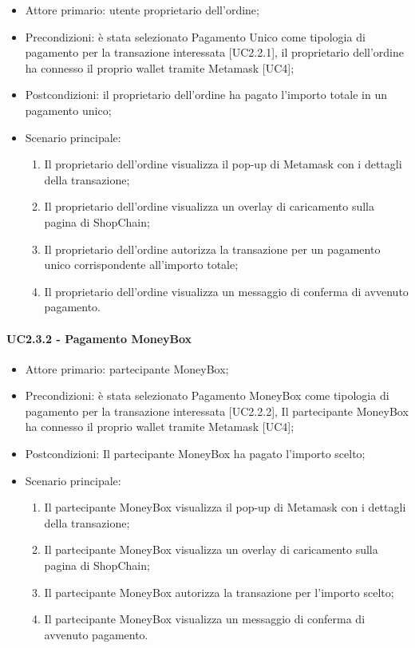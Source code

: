 \begin{itemize}
    \item Attore primario: utente proprietario dell'ordine;
    \item Precondizioni: è stata selezionato Pagamento Unico come tipologia di pagamento per la transazione interessata [UC2.2.1], 
            il proprietario dell'ordine ha connesso il proprio wallet\glo{} tramite Metamask\glo{} [UC4];
    \item Postcondizioni: il proprietario dell'ordine ha pagato l'importo totale in un pagamento unico;
    \item Scenario principale:
    \begin{enumerate}
        \item Il proprietario dell'ordine visualizza il pop-up di Metamask\glo{} con i dettagli della transazione;
        \item Il proprietario dell'ordine visualizza un overlay di caricamento sulla pagina di ShopChain;
        \item Il proprietario dell'ordine autorizza la transazione per un pagamento unico corrispondente all'importo totale;
        \item Il proprietario dell'ordine visualizza un messaggio di conferma di avvenuto pagamento.
    \end{enumerate}
\end{itemize}

\paragraph{UC2.3.2 - Pagamento MoneyBox}

\begin{itemize}
    \item Attore primario: partecipante MoneyBox\glo{};
    \item Precondizioni: è stata selezionato Pagamento MoneyBox\glo{} come tipologia di pagamento per la transazione interessata [UC2.2.2], 
            Il partecipante MoneyBox\glo{} ha connesso il proprio wallet\glo{} tramite Metamask\glo{} [UC4];
    \item Postcondizioni: Il partecipante MoneyBox\glo{} ha pagato l'importo scelto;
    \item Scenario principale:
    \begin{enumerate}
        \item Il partecipante MoneyBox\glo{} visualizza il pop-up di Metamask\glo{} con i dettagli della transazione;
        \item Il partecipante MoneyBox\glo{} visualizza un overlay di caricamento sulla pagina di ShopChain;
        \item Il partecipante MoneyBox\glo{} autorizza la transazione per l'importo scelto;
        \item Il partecipante MoneyBox\glo{} visualizza un messaggio di conferma di avvenuto pagamento.
    \end{enumerate}
\end{itemize}


